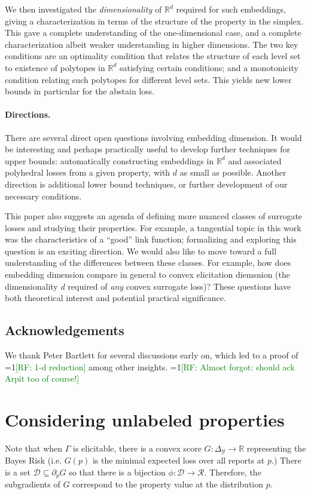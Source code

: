 \documentclass[anon,12pt]{colt2019}
\newcommand{\Comments}{1}
\newcommand{\mynote}[2]{\ifnum\Comments=1\textcolor{#1}{#2}\fi}
\newcommand{\raf}[1]{\mynote{green}{[RF: #1]}}
\newcommand{\reals}{\mathbb{R}}
\newcommand{\simplex}{\Delta_\Y}
\newcommand{\D}{\mathcal{D}}
\newcommand{\R}{\mathcal{R}}
\newcommand{\Y}{\mathcal{Y}}
\begin{document}
We then investigated the \emph{dimensionality} of $\reals^d$ required for such embeddings, giving a characterization in terms of the structure of the property in the simplex.
This gave a complete understanding of the one-dimensional case, and a complete characterization albeit weaker understanding in higher dimensions.
The two key conditions are an optimality condition that relates the structure of each level set to existence of polytopes in $\reals^d$ satisfying certain conditions; and a monotonicity condition relating such polytopes for different level sets.
This yields new lower bounds in particular for the abstain loss.

\paragraph{Directions.}
There are several direct open questions involving embedding dimension.
It would be interesting and perhaps practically useful to develop further techniques for upper bounds: automatically constructing embeddings in $\reals^d$ and associated polyhedral losses from a given property, with $d$ as small as possible.
Another direction is additional lower bound techniques, or further development of our necessary conditions.

This paper also suggests an agenda of defining more nuanced classes of surrogate losses and studying their properties.
For example, a tangential topic in this work was the characteristics of a ``good'' link function; formalizing and exploring this question is an exciting direction.
We would also like to move toward a full understanding of the differences between these classes.
For example, how does embedding dimension compare in general to convex elicitation diemsnion (the dimensionality $d$ required of \emph{any} convex surrogate loss)?
These questions have both theoretical interest and potential practical significance.

\subsection*{Acknowledgements}
We thank Peter Bartlett for several discussions early on, which led to a proof of \raf{1-d reduction} among other insights.
\raf{Almost forgot: should ack Arpit too of course!}



\appendix

\section{Considering unlabeled properties}
  Note that when $\Gamma$ is elicitable, there is a convex score $G:\simplex \to \reals$ representing the Bayes Risk (i.e. $G(p)$ is the minimal expected loss over all reports at $p$.)
  There is a set $\D \subseteq \partial_p G$ so that there is a bijection $\phi:\D \to \R$.
  Therefore, the subgradients of $G$ correspond to the property value at the distribution $p$.
\end{document}
